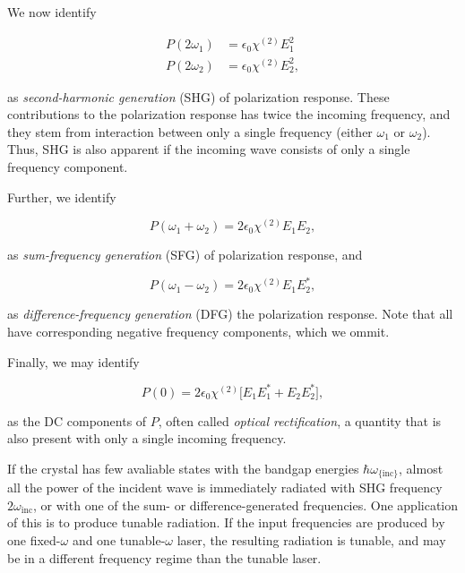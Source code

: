 \documentclass{article}
\begin{document}
We now identify

\begin{align}
P(2\omega_1) & = \epsilon_0\chi^{(2)}E_1^2 \label{SHG1} \\
P(2\omega_2) & = \epsilon_0\chi^{(2)}E_2^2, \label{SHG2}
\end{align}

as \textit{second-harmonic generation} (SHG) of polarization response. These contributions to the polarization response has twice the incoming frequency, and they stem from interaction between only a single frequency (either $\omega_1$ or $\omega_2$). Thus, SHG is also apparent if the incoming wave consists of only a single frequency component.

Further, we identify

\begin{equation}
\label{SFG}
P(\omega_1 + \omega_2) = 2\epsilon_0\chi^{(2)}E_1 E_2,
\end{equation}

as \textit{sum-frequency generation} (SFG) of polarization response, and

\begin{equation}
\label{DFG}
P(\omega_1 - \omega_2) = 2\epsilon_0\chi^{(2)}E_1 E_2^* , 
\end{equation}

as \textit{difference-frequency generation} (DFG) the polarization response. Note that  all have corresponding negative frequency components, which we ommit.

Finally, we may identify

\begin{equation}
\label{OR}
P(0) = 2\epsilon_0\chi^{(2)} \bigg[ E_1 E_1^* + E_2 E_2^* \bigg],
\end{equation}

as the DC components of $P$, often called \textit{optical rectification}, a quantity that is also present with only a single incoming frequency.

If the crystal has few avaliable states with the bandgap energies $\hbar \omega_{\{\text{inc}\}}$, almost all the power of the incident wave is immediately radiated with SHG frequency $2\omega_{\text{inc}}$, or with one of the sum- or difference-generated frequencies. One application of this is to produce tunable radiation. If the input frequencies are produced by one fixed-$\omega$ and one tunable-$\omega$ laser, the resulting radiation is tunable, and may be in a different frequency regime than the tunable laser.
\end{document}
